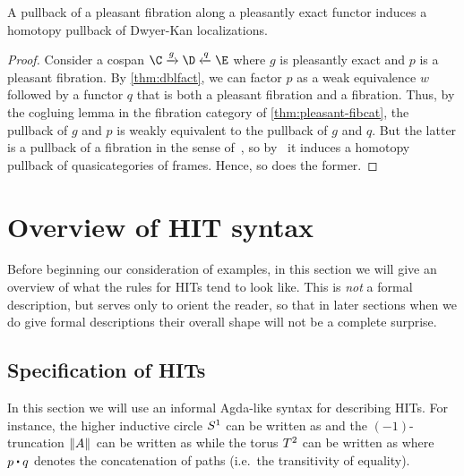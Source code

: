 \documentclass{amsart}
\begin{document}
\begin{thm}
  A pullback of a pleasant fibration along a pleasantly exact functor induces a homotopy pullback of Dwyer-Kan localizations.
\end{thm}
\begin{proof}
  Consider a cospan $\C \xto{g} \D \xot{q} \E$ where $g$ is pleasantly exact and $p$ is a pleasant fibration.
  By \cref{thm:dblfact}, we can factor $p$ as a weak equivalence $w$ followed by a functor $q$ that is both a pleasant fibration and a fibration.
  Thus, by the cogluing lemma in the fibration category of \cref{thm:pleasant-fibcat}, the pullback of $g$ and $p$ is weakly equivalent to the pullback of $g$ and $q$.
  But the latter is a pullback of a fibration in the sense of~\cite{szumilo:cocompl-hoth}, so by~\cite[Propositions 3.4 and 3.15]{szumilo:cocompl-hoth} it induces a homotopy pullback of quasicategories of frames.
  Hence, so does the former.
\end{proof}



\section{Overview of HIT syntax}
\label{sec:syntax}

Before beginning our consideration of examples, in this section we will give an overview of what the rules for HITs tend to look like.
This is \emph{not} a formal description, but serves only to orient the reader, so that in later sections when we do give formal descriptions their overall shape will not be a complete surprise.


\subsection{Specification of HITs}
\label{sec:hit-specs}

In this section we will use an informal Agda-like syntax for describing HITs.
For instance, the higher inductive circle $S^1$ can be written as
\indef{\circtype}{
  \fbase : \circtype \OR
  \floop : \id[\circtype]{\fbase}{\fbase}
}
and the $(-1)$-truncation $\mathopen{}\left\Vert A\right\Vert_{}\mathclose{}$ can be written as
while the torus $T^2$ can be written as
where $p\ct q$ denotes the concatenation of paths (i.e.\ the transitivity of equality).
\end{document}
